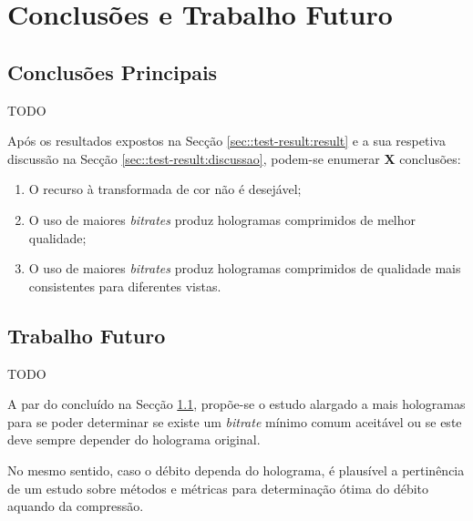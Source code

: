 \chapter{Conclusões e Trabalho Futuro}
\label{ch::conclusao}

\section{Conclusões Principais}
\label{sec::conclusao:principal}


TODO

Após os resultados expostos na Secção \ref{sec::test-result:result} e a sua respetiva discussão na Secção \ref{sec::test-result:discussao}, podem-se enumerar \textbf{X} conclusões:

\begin{enumerate}
    \item O recurso à transformada de cor não é desejável;
    \item O uso de maiores \textit{bitrates} produz hologramas comprimidos de melhor qualidade;
    \item O uso de maiores \textit{bitrates} produz hologramas comprimidos de qualidade mais consistentes para diferentes vistas.
\end{enumerate}







\section{Trabalho Futuro}
\label{sec::conclusao:futuro}


TODO

A par do concluído na Secção \ref{sec::conclusao:principal}, propõe-se o estudo alargado a mais hologramas para se poder determinar se existe um \textit{bitrate} mínimo comum  aceitável ou se este deve sempre depender do holograma original.

No mesmo sentido, caso o débito dependa do holograma, é plausível a pertinência de um estudo sobre métodos e métricas para determinação ótima do débito aquando da compressão.

